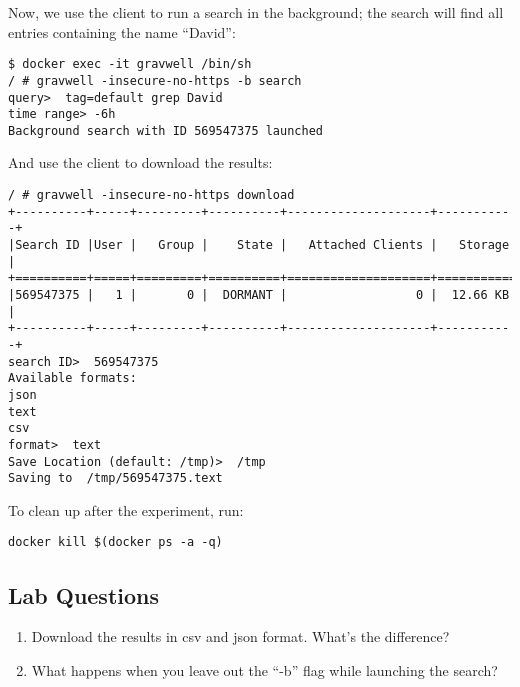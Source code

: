 Now, we use the client to run a search in the background; the search
will find all entries containing the name ``David'':

\begin{Verbatim}[breaklines=true]
$ docker exec -it gravwell /bin/sh
/ # gravwell -insecure-no-https -b search
query>  tag=default grep David
time range> -6h
Background search with ID 569547375 launched
\end{Verbatim}

And use the client to download the results:

\begin{Verbatim}[breaklines=true]
/ # gravwell -insecure-no-https download
+----------+-----+---------+----------+--------------------+-----------+
|Search ID |User |   Group |    State |   Attached Clients |   Storage |
+==========+=====+=========+==========+====================+===========+
|569547375 |   1 |       0 |  DORMANT |                  0 |  12.66 KB |
+----------+-----+---------+----------+--------------------+-----------+
search ID>  569547375
Available formats:
json
text
csv
format>  text
Save Location (default: /tmp)>  /tmp
Saving to  /tmp/569547375.text
\end{Verbatim}

To clean up after the experiment, run:

\begin{Verbatim}[breaklines=true]
docker kill $(docker ps -a -q)
\end{Verbatim}

\subsection{Lab Questions}

\begin{enumerate}
\item
  Download the results in csv and json format. What's the difference?
\item
  What happens when you leave out the ``-b'' flag while launching the
  search?
\end{enumerate}
